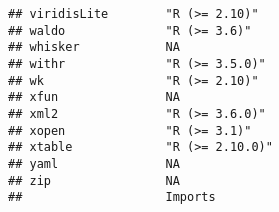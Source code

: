 \documentclass[
]{article}
\begin{document}
\begin{verbatim}
## viridisLite        "R (>= 2.10)"                                                                                                                                                                                         
## waldo              "R (>= 3.6)"                                                                                                                                                                                          
## whisker            NA                                                                                                                                                                                                    
## withr              "R (>= 3.5.0)"                                                                                                                                                                                        
## wk                 "R (>= 2.10)"                                                                                                                                                                                         
## xfun               NA                                                                                                                                                                                                    
## xml2               "R (>= 3.6.0)"                                                                                                                                                                                        
## xopen              "R (>= 3.1)"                                                                                                                                                                                          
## xtable             "R (>= 2.10.0)"                                                                                                                                                                                       
## yaml               NA                                                                                                                                                                                                    
## zip                NA                                                                                                                                                                                                    
##                    Imports                                                                                                                                                                                                                                                                                                                                                                                                                                      

\end{verbatim}
\end{document}
